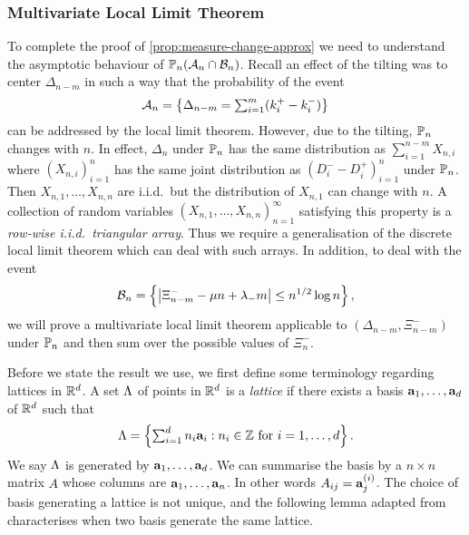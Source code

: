 \subsubsection{Multivariate Local Limit Theorem}\label{subsec:multivarlocallimit}

To complete the proof of \cref{prop:measure-change-approx} we need to understand the asymptotic behaviour of $\P_n(\lltEvent_n \cap \omegaEvent_n)$. Recall an effect of the tilting was to center $\Delta_{n-m}$ in such a way that the probability of the event
\begin{equation*}
    \lltEvent_n = \left\{ 
        \Delta_{n-m} = \textstyle \sum_{i=1}^m (k_i^+ - k_i^-)
    \right\}
\end{equation*}
can be addressed by the local limit theorem. However, due to the tilting, $\P_n$ changes with $n$. In effect, $\Delta_n$ under $\P_n$ has the same distribution as $\sum_{i=1}^{n-m} X_{n, i}$ where $(X_{n, i})_{i=1}^n$ has the same joint distribution as $(D_i^- - D_i^+)_{i=1}^n$ under $\P_n$. Then $X_{n, 1}, \ldots, X_{n, n}$ are i.i.d.\ but the distribution of $X_{n, 1}$ can change with $n$. A collection of random variables $(X_{n, 1}, \ldots, X_{n, n})_{n = 1}^{\infty}$ satisfying this property is a \emph{row-wise i.i.d.\ triangular array}. Thus we require a generalisation of the discrete local limit theorem which can deal with such arrays. In addition, to deal with the event
\begin{equation*}
    \omegaEvent_n = \left\{ 
        \abs*{\Xi_{n-m}^- - \mu n + \lambda_- m} \leq n^{1/2} \log n
    \right\},
\end{equation*}
we will prove a multivariate local limit theorem applicable to $(\Delta_{n-m}, \Xi^-_{n-m})$ under $\P_n$ and then sum over the possible values of $\Xi^-_n$.

Before we state the result we use, we first define some terminology regarding lattices in $\R^d$. A set $\lattice$ of points in $\R^d$ is a \emph{lattice} if there exists a basis $\va_1, \ldots, \va_d$ of $\R^d$ such that
\begin{equation*}
    \lattice = \left\{ 
        \textstyle \sum_{i=1}^d n_i \va_i : n_i \in \Z \text{ for $i = 1, \ldots, d$}
    \right\}.
\end{equation*}
We say $\lattice$ is generated by $\va_1, \ldots, \va_d$. We can summarise the basis by a $n \times n$ matrix $A$ whose columns are $\va_1, \ldots, \va_n$. In other words $A_{ij} = \va_j^{(i)}$. The choice of basis generating a lattice is not unique, and the following lemma adapted from \cite[Corollary 4.3a]{schrijverTheoryLinearInteger1998} characterises when two basis generate the same lattice.

